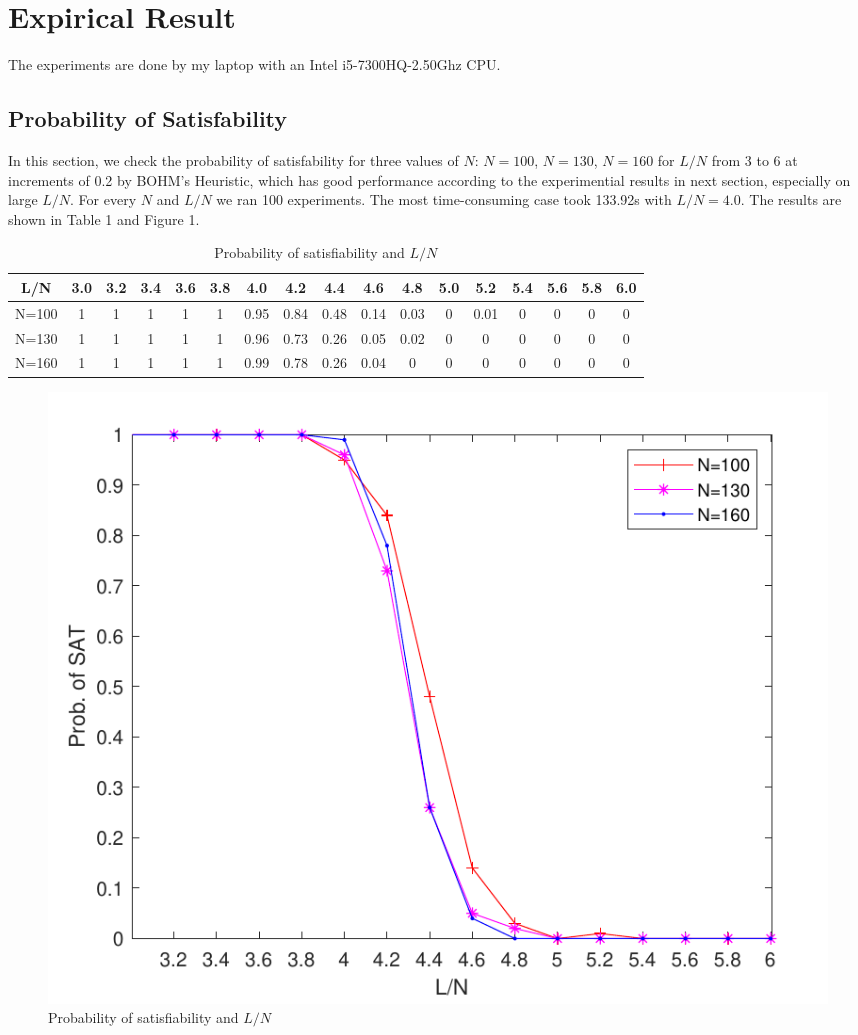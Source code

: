 \documentclass[12pt]{article}
\begin{document}
	\section{Expirical Result}
	 The experiments are done by my laptop with an Intel i5-7300HQ-2.50Ghz CPU.
	\subsection{Probability of Satisfability}
	In this section, we check the probability of satisfability for three values of $N$: $N=100$, $N=130$, $N=160$ for $L/N$ from 3 to 6 at increments of 0.2 by BOHM's Heuristic, which has good performance according to the experimential results in next section, especially on large $L/N$. For every $N$ and $L/N$ we ran 100 experiments. The most time-consuming case took 133.92s with $L/N=4.0$. The results are shown in Table 1 and Figure 1. 
	
\begin{center}
	\begin{table}[th!]
	\caption{Probability of satisfiability and $L/N$}
		\begin{tabular}{|c|c|c|c|c|c|c|c|c|c|c|c|c|c|c|c|c|}
		\hline 
	 L/N& 3.0 &3.2  & 3.4 & 3.6 & 3.8 & 4.0 & 4.2 & 4.4 & 4.6 & 4.8 & 5.0 &5.2  & 5.4 & 5.6 & 5.8 & 6.0 \\ 
		\hline 
	N=100	&  1& 1 & 1 & 1 & 1 & 0.95 & 0.84 & 0.48 & 0.14 & 0.03 & 0 & 0.01 & 0 & 0 & 0 & 0 \\ 
		\hline 
			N=130	& 1 & 1& 1& 1 & 1 & 0.96 & 0.73 & 0.26  & 0.05 & 0.02 & 0 & 0 & 0 & 0 & 0 & 0 \\ 
		\hline 
			N=160	& 1 & 1 & 1 & 1 & 1 & 0.99 &0.78  & 0.26 & 0.04 & 0 & 0 & 0 & 0 & 0 & 0 & 0 \\ 
		\hline 
	\end{tabular} 
\end{table}
\end{center}

\begin{figure}
	\centering
	\includegraphics[width=0.5\linewidth]{ProbvsLN}
	\caption{Probability of satisfiability and $L/N$}
	\label{fig:prob-vs-ln}
\end{figure}
\end{document}
